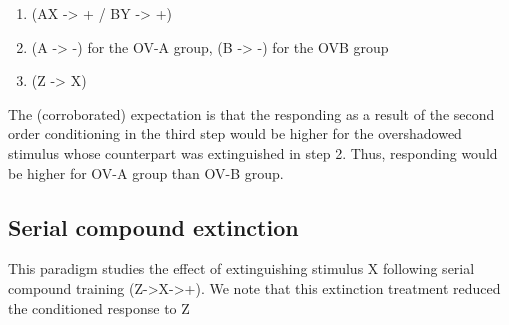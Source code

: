 \documentclass[11pt]{article}
\begin{document}
\begin{enumerate}
\item (AX -> + / BY -> +)
\item (A -> -) for the OV-A group, (B -> -) for the OVB group
\item (Z -> X)
\end{enumerate}

The (corroborated) expectation is that the responding as a result of the second order conditioning in the third step would be higher for the overshadowed stimulus whose counterpart was extinguished in step 2. Thus, responding would be higher for OV-A group than OV-B group.

\begin{center}

\end{center}

\begin{center}

\end{center}

\begin{center}

\end{center}

\begin{center}

\end{center}

\begin{center}

\end{center}

\newpage

\subsection{Serial compound extinction}
\label{sec:org9228a21}

This paradigm studies the effect of extinguishing stimulus X following serial compound training (Z->X->+). We note that this extinction treatment reduced the conditioned response to Z 

\begin{center}

\end{center}
\end{document}
